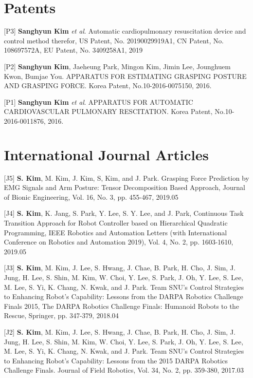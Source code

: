 \documentclass[margin,line]{res}
\begin{document}
\begin{resume}
\section{\sc Patents} 
[P3]  \textbf{Sanghyun Kim} \textit{et al}. Automatic cardiopulmonary resuscitation device and control method therefor, US Patent, No. 20190029919A1, CN Patent, No. 108697572A, EU Patent, No. 3409258A1, 2019

[P2] \textbf{Sanghyun Kim}, {Jaeheung Park}, Mingon Kim, Jimin Lee, Jounghuem Kwon, Bumjae You. 
APPARATUS FOR ESTIMATING GRASPING POSTURE AND GRASPING FORCE.
Korea Patent, No.10-2016-0075150, 2016.

[P1] \textbf{Sanghyun Kim} \textit{et al}. 
APPARATUS FOR AUTOMATIC CARDIOVASCULAR PULMONARY RESCITATION.
Korea Patent, No.10-2016-0011876, 2016.
%

\section{\sc International Journal Articles}


[J5] \textbf{S. Kim}, M. Kim, J. Kim, S, Kim, and J. Park.
Grasping Force Prediction by EMG Signals and Arm Posture: Tensor Decomposition Based Approach,
Journal of Bionic Engineering, Vol. 16, No. 3, pp.  455-467, 2019.05

[J4] \textbf{S. Kim}, K. Jang, S. Park, Y. Lee, S. Y. Lee, and J. Park, Continuous Task Transition Approach for Robot Controller based on Hierarchical Quadratic Programming, IEEE Robotics and Automation Letters (with International Conference on Robotics and Automation 2019), Vol. 4, No. 2, pp. 1603-1610, 2019.05

[J3] \textbf{S. Kim}, M. Kim, J. Lee, S. Hwang, J. Chae, B. Park, H. Cho, J. Sim, J. Jung, H. Lee, S. Shin, M. Kim, W. Choi, Y. Lee, S. Park, J. Oh, Y. Lee, S. Lee, M. Lee, S. Yi, K. Chang, N. Kwak, and {J. Park}.
Team SNU’s Control Strategies to Enhancing Robot’s Capability: Lessons from the DARPA Robotics Challenge Finals 2015, The DARPA Robotics Challenge Finals: Humanoid Robots to the Rescue, Springer, pp. 347-379, 2018.04

[J2] \textbf{S. Kim}, M. Kim, J. Lee, S. Hwang, J. Chae, B. Park, H. Cho, J. Sim, J. Jung, H. Lee, S. Shin, M. Kim, W. Choi, Y. Lee, S. Park, J. Oh, Y. Lee, S. Lee, M. Lee, S. Yi, K. Chang, N. Kwak, and {J. Park}.
Team SNU’s Control Strategies to Enhancing Robot’s Capability: Lessons from the 2015 DARPA Robotics Challenge Finals. Journal of Field Robotics, Vol. 34, No. 2, pp. 359-380, 2017.03


\end{resume}
\end{document}
